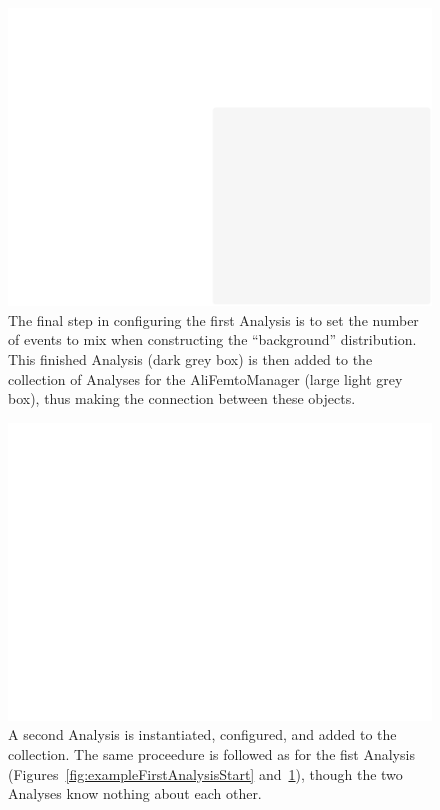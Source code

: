 \documentclass[twoside]{article}
\newcommand{\name}[1]{\textsf{#1}}%
\begin{document}
\begin{figure}[t]
\includegraphics[width=\textwidth]{ExampleMacro3.pdf}
\caption{The final step in configuring the first Analysis is to set the number of events to mix when constructing
the ``background'' distribution.  This finished Analysis (dark grey box) is then added to the collection of Analyses
for the \name{AliFemtoManager} (large light grey box), thus making the connection between these objects.
\label{fig:exampleFirstAnalysisFinish}
}
\end{figure}

\begin{figure}[t]
\includegraphics[width=\textwidth]{ExampleMacro4.pdf}
\caption{A second Analysis is instantiated, configured, and added to the collection.  The same
proceedure is followed as for the fist Analysis (Figures~\ref{fig:exampleFirstAnalysisStart}
and~\ref{fig:exampleFirstAnalysisFinish}), though the two Analyses know nothing about each other.
\label{fig:exampleSecondAnalysis}
}
\end{figure}
\end{document}
